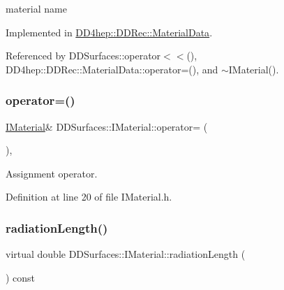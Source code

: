 material name 



Implemented in \hyperlink{class_d_d4hep_1_1_d_d_rec_1_1_material_data_a9e78435056d6908a5521176548461cc2}{D\+D4hep\+::\+D\+D\+Rec\+::\+Material\+Data}.



Referenced by D\+D\+Surfaces\+::operator$<$$<$(), D\+D4hep\+::\+D\+D\+Rec\+::\+Material\+Data\+::operator=(), and $\sim$\+I\+Material().

\hypertarget{class_d_d_surfaces_1_1_i_material_ad50224941bead73447e93594edaaad04}{}\label{class_d_d_surfaces_1_1_i_material_ad50224941bead73447e93594edaaad04} 
\subsubsection{\texorpdfstring{operator=()}{operator=()}}
{\footnotesize\ttfamily \hyperlink{class_d_d_surfaces_1_1_i_material}{I\+Material}\& D\+D\+Surfaces\+::\+I\+Material\+::operator= (\begin{DoxyParamCaption}\item[{const \hyperlink{class_d_d_surfaces_1_1_i_material}{I\+Material} \&}]{ }\end{DoxyParamCaption})\hspace{0.3cm}{\ttfamily [inline]}, {\ttfamily [protected]}}



Assignment operator. 



Definition at line 20 of file I\+Material.\+h.

\hypertarget{class_d_d_surfaces_1_1_i_material_a30bf2290a5f4616d6f0ad5bd2e500300}{}\label{class_d_d_surfaces_1_1_i_material_a30bf2290a5f4616d6f0ad5bd2e500300} 
\subsubsection{\texorpdfstring{radiation\+Length()}{radiationLength()}}
{\footnotesize\ttfamily virtual double D\+D\+Surfaces\+::\+I\+Material\+::radiation\+Length (\begin{DoxyParamCaption}{ }\end{DoxyParamCaption}) const\hspace{0.3cm}{\ttfamily [pure virtual]}}



